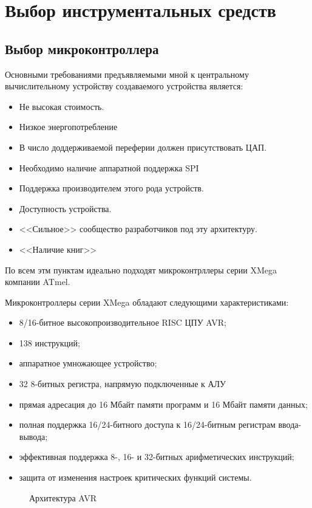\section{Выбор инструментальных средств}

\subsection{Выбор микроконтроллера}
Основными требованиями предъявляемыми мной к центральному вычислительному устройству создаваемого устройства является:
\begin{itemize}
	\item{} Не высокая стоимость.
	\item{} Низкое энергопотребление
	\item{} В число доддерживаемой переферии должен присутствовать ЦАП. 
	\item{} Необходимо наличие аппаратной поддержка SPI
	\item{} Поддержка производителем этого рода устройств.
	\item{} Доступность устройства.
	\item{} <<Сильное>> сообщество разработчиков под эту архитектуру.
	\item{} <<Наличие книг>>
\end{itemize}

По всем этм пунктам идеально подходят микроконтрллеры серии XMega компании ATmel.

Микроконтроллеры серии XMega обладают следующими характеристиками:
\begin{itemize}
	\item{} 8/16-битное высокопроизводительное RISC ЦПУ AVR;
	\item{} 138 инструкций;
	\item{} аппаратное умножающее устройство;
	\item{} 32 8-битных регистра, напрямую подключенные к АЛУ
	\item{} прямая адресация до 16 Мбайт памяти программ и 16 Мбайт памяти данных;
	\item{} полная поддержка 16/24-битного доступа к 16/24-битным регистрам ввода-вывода;
	\item{} эффективная поддержка 8-, 16- и 32-битных арифметических инструкций;
	\item{} защита от изменения настроек критических функций системы.
\end{itemize}

\begin{par}
\begin{figure}[h]
	\caption{Архитектура AVR}
	\label{img:avr_arch}
\end{figure}
\end{par}

